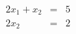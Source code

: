 \documentclass{jsarticle}
\begin{document}
\begin{eqnarray}
    2x_1 + x_2 & = & 5 \\
    2x_2 & = & 2
\end{eqnarray}
\end{document}
